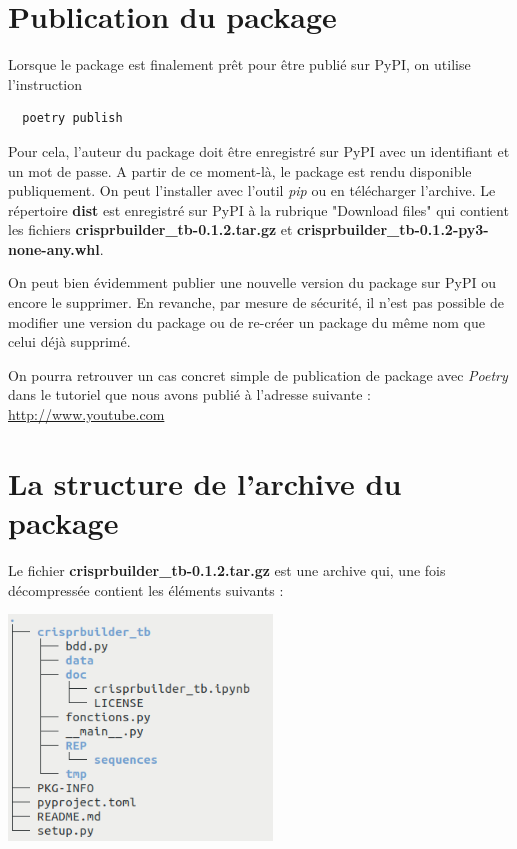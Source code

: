 \documentclass[twoside,a4paper,11pt,frenchb,openany]{report}
\begin{document}
\section{Publication du package}

Lorsque le package est finalement prêt pour être publié sur PyPI, on utilise l’instruction

\begin{verbatim}  poetry publish\end{verbatim}

Pour cela, l'auteur du package doit être enregistré sur PyPI avec un identifiant et un mot de passe. A partir de ce moment-là, le package est rendu disponible publiquement. On peut l'installer avec l'outil \textit{pip} ou en télécharger l'archive. Le répertoire \textbf{dist} est enregistré sur PyPI à la rubrique "Download files" qui contient les fichiers \textbf{crisprbuilder\_tb-0.1.2.tar.gz} et \textbf{crisprbuilder\_tb-0.1.2-py3-none-any.whl}.

On peut bien évidemment publier une nouvelle version du package sur PyPI ou encore le supprimer. En revanche, par mesure de sécurité, il n'est pas possible de modifier une version du package ou de re-créer un package du même nom que celui déjà supprimé. 

On pourra retrouver un cas concret simple de publication de package avec \textit{Poetry} dans le tutoriel que nous avons publié à l'adresse suivante : \href{http://www.youtube.com}{http://www.youtube.com}





\section{La structure de l'archive du package}

Le fichier \textbf{crisprbuilder\_tb-0.1.2.tar.gz} est une archive qui, une fois décompressée contient les éléments suivants :

\includegraphics[width=7cm]{tar.png}
\end{document}
